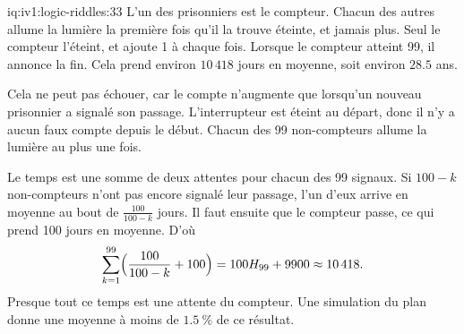 \begin{solution}{iq:iv1:logic-riddles:33}
L'un des prisonniers est le compteur. Chacun des autres allume la lumière la première fois qu'il la trouve éteinte, et jamais plus. Seul le compteur l'éteint, et ajoute 1 à chaque fois. Lorsque le compteur atteint 99, il annonce la fin. Cela prend environ $10\,418$ jours en moyenne, soit environ $28.5$ ans.

Cela ne peut pas échouer, car le compte n'augmente que lorsqu'un nouveau prisonnier a signalé son passage. L'interrupteur est éteint au départ, donc il n'y a aucun faux compte depuis le début. Chacun des 99 non-compteurs allume la lumière au plus une fois.

Le temps est une somme de deux attentes pour chacun des 99 signaux. Si $100 - k$ non-compteurs n'ont pas encore signalé leur passage, l'un d'eux arrive en moyenne au bout de $\frac{100}{100 - k}$ jours. Il faut ensuite que le compteur passe, ce qui prend 100 jours en moyenne. D'où
\[
\sum_{k = 1}^{99} \Bigl(\frac{100}{100 - k} + 100\Bigr) = 100 H_{99} + 9900 \approx 10\,418.
\]
Presque tout ce temps est une attente du compteur. Une simulation du plan donne une moyenne à moins de $1.5~\%$ de ce résultat.

\end{solution}

